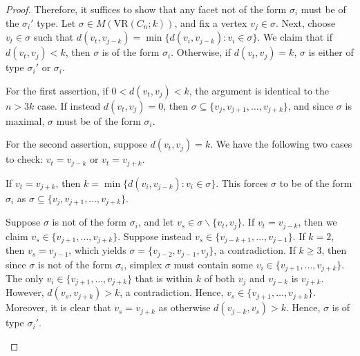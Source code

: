 \documentclass[12pt,a4paper]{amsart}
\theoremstyle{definition}
\newcommand{\vr}[2]{\mathrm{VR}(#1;#2)}
\numberwithin{equation}{section}
\begin{document}
\begin{proof}
Therefore, it suffices to show that any facet not of the form $\sigma_i$ must be of the $\sigma_i'$ type.
Let $\sigma\in M(\vr{C_n}{k})$, and fix a vertex $v_j\in\sigma$.
Next, choose $v_t\in\sigma$ such that $d(v_t, v_{j-k})=\min\{d(v_i,v_{j-k}): v_i\in\sigma\}$.
We claim that if $d(v_{t}, v_j)<k$, then $\sigma$ is of the form $\sigma_i$.
Otherwise, if $d(v_{t}, v_j)=k$, $\sigma$ is either of type $\sigma_i'$ or $\sigma_i$.

For the first assertion, if $0<d(v_{t}, v_j)<k$, the argument is identical to the $n>3k$ case.
If instead $d(v_{t}, v_j)=0$, then $\sigma\subseteq\{v_j, v_{j+1},\ldots, v_{j+k}\}$, and since $\sigma$ is maximal, $\sigma$ must be of the form $\sigma_i$.

For the second assertion, suppose $d(v_{t}, v_j)=k$.
We have the following two cases to check: $v_t=v_{j-k}$ or $v_t=v_{j+k}$.

If $v_t=v_{j+k}$, then $k=\min\{d(v_i,v_{j-k}): v_i\in\sigma\}$.
This forces $\sigma$ to be of the form $\sigma_i$ as $\sigma\subseteq \{v_j, v_{j+1},\ldots, v_{j+k}\}$.


Suppose $\sigma$ is not of the form $\sigma_i$, and let $v_s\in\sigma\backslash\{v_t, v_j\}$.
If $v_t=v_{j-k}$, then we claim $v_s\in\{v_{j+1},\ldots, v_{j+k}\}$.
Suppose instead $v_s\in\{v_{j-k+1},\ldots, v_{j-1}\}$.
If $k=2$, then $v_s=v_{j-1}$, which yields $\sigma=\{v_{j-2},v_{j-1}, v_j\}$, a contradiction.
If $k\geq 3$, then since $\sigma$ is not of the form $\sigma_i$, simplex $\sigma$ must contain some $v_i\in \{v_{j+1},\ldots, v_{j+k}\}$.
The only $v_i\in \{v_{j+1},\ldots, v_{j+k}\}$ that is within $k$ of both $v_j$ and $v_{j-k}$ is $v_{j+k}$.
However, $d(v_s, v_{j+k})>k$, a contradiction.
Hence, $v_s\in \{v_{j+1},\ldots, v_{j+k}\}$.
Moreover, it is clear that $v_s=v_{j+k}$ as otherwise $d(v_{j-k}, v_s)>k$.
Hence, $\sigma$ is of type $\sigma_i'$.

\begin{figure}[h]
\begin{center}
\end{center}
\end{figure}
\end{proof}
\end{document}
